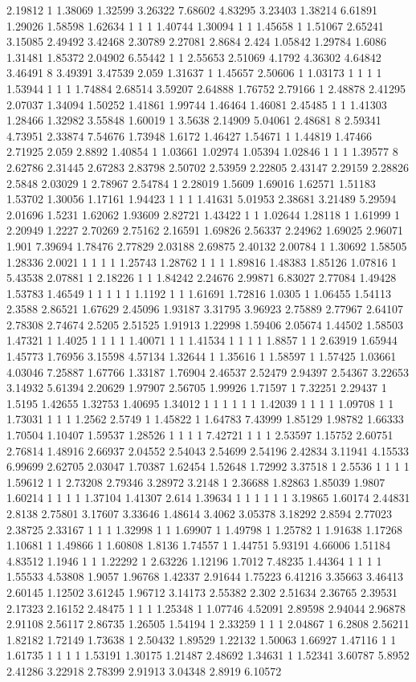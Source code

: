 2.19812 1 1.38069 1.32599 3.26322 7.68602 4.83295 3.23403 1.38214 6.61891 1.29026 1.58598 1.62634 1 1 1 1.40744 1.30094 1 1 1.45658 1 1.51067 2.65241 3.15085 2.49492 3.42468 2.30789 2.27081 2.8684 2.424 1.05842 1.29784 1.6086 1.31481 1.85372 2.04902 6.55442 1 1 2.55653 2.51069 4.1792 4.36302 4.64842 3.46491 8 3.49391 3.47539 2.059 1.31637 1 1.45657 2.50606 1 1.03173 1 1 1 1 1.53944 1 1 1 1.74884 2.68514 3.59207 2.64888 1.76752 2.79166 1 2.48878 2.41295 2.07037 1.34094 1.50252 1.41861 1.99744 1.46464 1.46081 2.45485 1 1 1.41303 1.28466 1.32982 3.55848 1.60019 1 3.5638 2.14909 5.04061 2.48681 8 2.59341 4.73951 2.33874 7.54676 1.73948 1.6172 1.46427 1.54671 1 1.44819 1.47466 2.71925 2.059 2.8892 1.40854 1 1.03661 1.02974 1.05394 1.02846 1 1 1 1.39577 8 2.62786 2.31445 2.67283 2.83798 2.50702 2.53959 2.22805 2.43147 2.29159 2.28826 2.5848 2.03029 1 2.78967 2.54784 1 2.28019 1.5609 1.69016 1.62571 1.51183 1.53702 1.30056 1.17161 1.94423 1 1 1 1.41631 5.01953 2.38681 3.21489 5.29594 2.01696 1.5231 1.62062 1.93609 2.82721 1.43422 1 1 1.02644 1.28118 1 1.61999 1 2.20949 1.2227 2.70269 2.75162 2.16591 1.69826 2.56337 2.24962 1.69025 2.96071 1.901 7.39694 1.78476 2.77829 2.03188 2.69875 2.40132 2.00784 1 1.30692 1.58505 1.28336 2.0021 1 1 1 1 1.25743 1.28762 1 1 1 1.89816 1.48383 1.85126 1.07816 1 5.43538 2.07881 1 2.18226 1 1 1.84242 2.24676 2.99871 6.83027 2.77084 1.49428 1.53783 1.46549 1 1 1 1 1 1.1192 1 1 1.61691 1.72816 1.0305 1 1.06455 1.54113 2.3588 2.86521 1.67629 2.45096 1.93187 3.31795 3.96923 2.75889 2.77967 2.64107 2.78308 2.74674 2.5205 2.51525 1.91913 1.22998 1.59406 2.05674 1.44502 1.58503 1.47321 1 1.4025 1 1 1 1 1.40071 1 1 1.41534 1 1 1 1 1.8857 1 1 2.63919 1.65944 1.45773 1.76956 3.15598 4.57134 1.32644 1 1.35616 1 1.58597 1 1.57425 1.03661 4.03046 7.25887 1.67766 1.33187 1.76904 2.46537 2.52479 2.94397 2.54367 3.22653 3.14932 5.61394 2.20629 1.97907 2.56705 1.99926 1.71597 1 7.32251 2.29437 1 1.5195 1.42655 1.32753 1.40695 1.34012 1 1 1 1 1 1 1.42039 1 1 1 1 1.09708 1 1 1.73031 1 1 1 1.2562 2.5749 1 1.45822 1 1.64783 7.43999 1.85129 1.98782 1.66333 1.70504 1.10407 1.59537 1.28526 1 1 1 1 7.42721 1 1 1 2.53597 1.15752 2.60751 2.76814 1.48916 2.66937 2.04552 2.54043 2.54699 2.54196 2.42834 3.11941 4.15533 6.99699 2.62705 2.03047 1.70387 1.62454 1.52648 1.72992 3.37518 1 2.5536 1 1 1 1 1.59612 1 1 2.73208 2.79346 3.28972 3.2148 1 2.36688 1.82863 1.85039 1.9807 1.60214 1 1 1 1 1.37104 1.41307 2.614 1.39634 1 1 1 1 1 1 3.19865 1.60174 2.44831 2.8138 2.75801 3.17607 3.33646 1.48614 3.4062 3.05378 3.18292 2.8594 2.77023 2.38725 2.33167 1 1 1 1.32998 1 1 1.69907 1 1.49798 1 1.25782 1 1.91638 1.17268 1.10681 1 1.49866 1 1.60808 1.8136 1.74557 1 1.44751 5.93191 4.66006 1.51184 4.83512 1.1946 1 1 1.22292 1 2.63226 1.12196 1.7012 7.48235 1.44364 1 1 1 1 1.55533 4.53808 1.9057 1.96768 1.42337 2.91644 1.75223 6.41216 3.35663 3.46413 2.60145 1.12502 3.61245 1.96712 3.14173 2.55382 2.302 2.51634 2.36765 2.39531 2.17323 2.16152 2.48475 1 1 1 1.25348 1 1.07746 4.52091 2.89598 2.94044 2.96878 2.91108 2.56117 2.86735 1.26505 1.54194 1 2.33259 1 1 1 2.04867 1 6.2808 2.56211 1.82182 1.72149 1.73638 1 2.50432 1.89529 1.22132 1.50063 1.66927 1.47116 1 1 1.61735 1 1 1 1 1.53191 1.30175 1.21487 2.48692 1.34631 1 1.52341 3.60787 5.8952 2.41286 3.22918 2.78399 2.91913 3.04348 2.8919 6.10572 